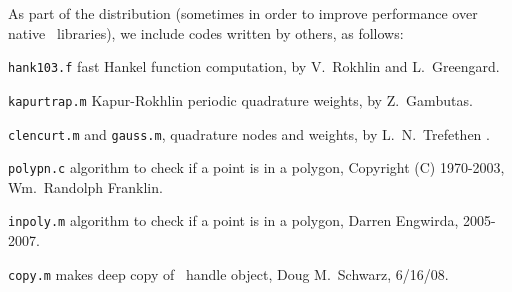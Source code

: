 \documentclass[12pt]{article}
\begin{document}
As part of the distribution (sometimes in order to
improve performance over native \matlab\ libraries),
we include codes written by others, as follows:
\bi
\item {\tt hank103.f} fast Hankel function computation, by
V.~Rokhlin and L.~Greengard.
\item {\tt kapurtrap.m} Kapur-Rokhlin periodic quadrature weights,
by Z.~Gambutas.
\item {\tt clencurt.m} and {\tt gauss.m}, quadrature nodes and weights,
by L.~N.~Trefethen \cite{tref}.
\item {\tt polypn.c} algorithm to check if a point is in a polygon,
Copyright (C) 1970-2003, Wm.~Randolph Franklin.
\item {\tt inpoly.m} algorithm to check if a point is in a polygon,
Darren Engwirda, 2005-2007.
\item {\tt copy.m} makes deep copy of \matlab\ handle object,
Doug M.~Schwarz, 6/16/08.
\ei





 

\end{document}
